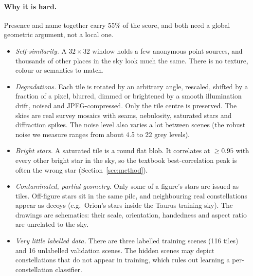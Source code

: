 \documentclass[a4paper,11pt]{article}
\begin{document}
\paragraph{Why it is hard.} Presence and name together carry 55\% of the score, and both need a global
geometric argument, not a local one.
\begin{itemize}
\item \emph{Self-similarity.} A $32\times32$ window holds a few anonymous point sources, and thousands of other places in
the sky look much the same. There is no texture, colour or semantics to match.
\item \emph{Degradations.} Each tile is rotated by an arbitrary angle, rescaled, shifted by a fraction of a pixel,
blurred, dimmed or brightened by a smooth illumination drift, noised and JPEG-compressed. Only the tile centre is
preserved. The skies are real survey mosaics with seams, nebulosity, saturated stars and diffraction spikes. The
noise level also varies a lot between scenes (the robust noise we measure ranges from about 4.5 to 22 grey levels).
\item \emph{Bright stars.} A saturated tile is a round flat blob. It correlates at $\geq0.95$ with every other bright
star in the sky, so the textbook best-correlation peak is often the wrong star (Section~\ref{sec:method}).
\item \emph{Contaminated, partial geometry.} Only some of a figure's stars are issued as tiles. Off-figure stars sit in
the same pile, and neighbouring real constellations appear as decoys (e.g.\ Orion's stars inside the Taurus training
sky). The drawings are schematics: their scale, orientation, handedness and aspect ratio are unrelated to the sky.
\item \emph{Very little labelled data.} There are three labelled training scenes (116 tiles) and 16 unlabelled
validation scenes. The hidden scenes may depict constellations that do not appear in training, which rules out
learning a per-constellation classifier.
\end{itemize}
\end{document}
